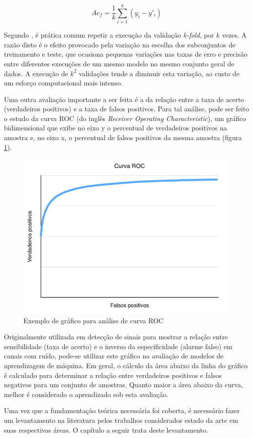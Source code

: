\begin{equation}
  \displaystyle Ac_f = \frac{1}{k} \sum_{i=1}^k{(y_i - y'_i)}
\label{eq:kfold}
\end{equation}

Segundo , é prática comum repetir a execução da validação \textit{k-fold}, por $k$ vezes. A razão disto é o efeito provocado pela variação na escolha dos subconjuntos de treinamento e teste, que ocasiona pequenas variações nas taxas de erro e precisão entre diferentes execuções de um mesmo modelo no mesmo conjunto geral de dados. A execução de $k^2$ validações tende a diminuir esta variação, ao custo de um esforço computacional mais intenso.

Uma outra avaliação importante a ser feita é a da relação entre a taxa de acerto (verdadeiros positivos) e  a taxa de falsos positivos. Para tal análise, pode ser feito o estudo da curva ROC (do inglês \textit{Receiver Operating Characteristic}), um gráfico bidimensional que exibe no eixo y o percentual de verdadeiros positivos na amostra e, no eixo x, o percentual de falsos positivos da mesma amostra (figura \ref{fig:roc}).

\begin{figure}[h]
  \centering
  \includegraphics[scale=0.6]{imgs/roc}
  \caption{Exemplo de gráfico para análise de curva ROC}
  \label{fig:roc}
\end{figure}

Originalmente utilizada em detecção de sinais para mostrar a relação entre sensibilidade (taxa de acerto) e o inverso da especificidade (alarme falso) em canais com ruído, pode-se utilizar este gráfico na avaliação de modelos de aprendizagem de máquina. Em geral, o cálculo da área abaixo da linha do gráfico é calculado para determinar a relação entre verdadeiros positivos e falsos negativos para um conjunto de amostras. Quanto maior a área abaixo da curva, melhor é considerado o aprendizado sob esta avaliação.

Uma vez que a fundamentação teórica necessária foi coberta, é necessário fazer um levantamento na literatura pelos trabalhos considerados estado da arte em suas respectivas áreas. O capítulo a seguir trata deste levantamento.